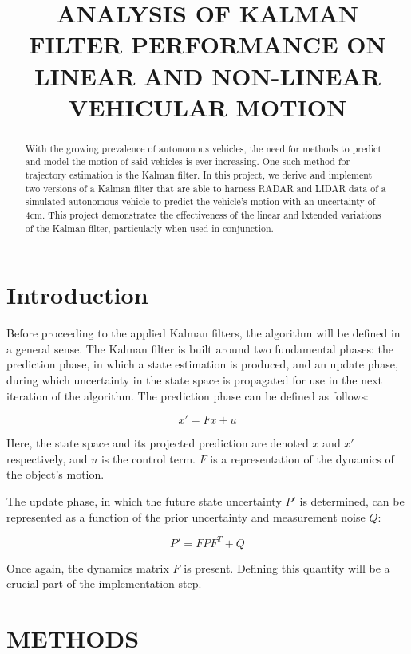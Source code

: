\documentclass{article}
\title{ANALYSIS OF KALMAN FILTER PERFORMANCE ON LINEAR AND NON-LINEAR VEHICULAR MOTION}
\begin{document}

\maketitle

\begin{abstract}

With the growing prevalence of autonomous vehicles, the need for methods to predict and model the motion of said vehicles is ever increasing. One such method for trajectory estimation is the Kalman filter. In this project, we derive and implement two versions of a Kalman filter that are able to harness RADAR and LIDAR data of a simulated autonomous vehicle to predict the vehicle’s motion with an uncertainty of 4cm. This project demonstrates the effectiveness of the linear and lxtended variations of the Kalman filter, particularly when used in conjunction.

\end{abstract}

\section{Introduction}
\label{sec:intro}

Before proceeding to the applied Kalman filters, the algorithm will be defined in a general sense. The Kalman filter is built around two fundamental phases: the prediction phase, in which a state estimation is produced, and an update phase, during which uncertainty in the state space is propagated for use in the next iteration of the algorithm. The prediction phase can be defined as follows:

$$x' = Fx+u$$

Here, the state space and its projected prediction are denoted $x$ and $x'$ respectively, and $u$ is the control term. $F$ is a representation of the dynamics of the object's motion.

The update phase, in which the future state uncertainty $P'$ is determined, can be represented as a function of the prior uncertainty and measurement noise $Q$:

$$P'=FPF^T+Q$$

Once again, the dynamics matrix $F$ is present. Defining this quantity will be a crucial part of the implementation step.

\section{METHODS}
\label{sec:methods}
\end{document}
